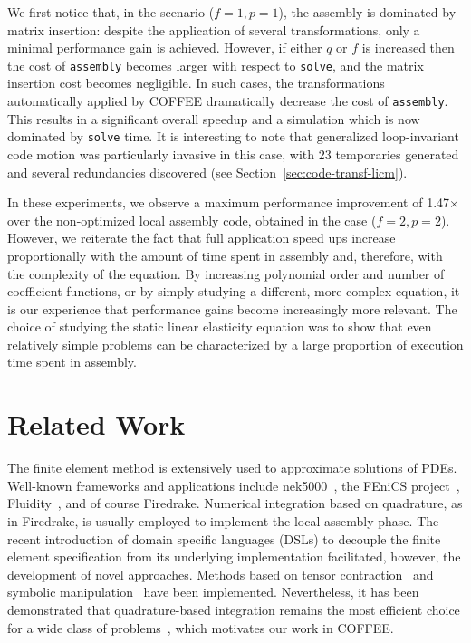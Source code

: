 We first notice that, in the scenario ($f=1, p=1$), the assembly is dominated by matrix insertion: despite the application of several transformations, only a minimal performance gain is achieved. However, if either $q$ or $f$ is increased then the cost of \texttt{assembly} becomes larger with respect to \texttt{solve}, and the matrix insertion cost becomes negligible. In such cases, the transformations automatically applied by COFFEE dramatically decrease the cost of \texttt{assembly}. This results in
a significant overall speedup and a simulation which is now dominated by \texttt{solve} time. It is interesting to note that generalized loop-invariant code motion was particularly invasive in this case, with 23 temporaries generated and several redundancies discovered (see Section~\ref{sec:code-transf-licm}).

In these experiments, we observe a maximum performance improvement of 1.47$\times$ over the non-optimized local assembly code, obtained in the case ($f=2, p=2$). However, we reiterate the fact that full application speed ups increase proportionally with the amount of time spent in assembly and, therefore, with the complexity of the equation. By
increasing polynomial order and number of coefficient functions, or by simply studying a different, more complex equation, it is our experience that performance gains become increasingly more relevant. The choice of studying the static linear elasticity equation was to show that even relatively simple problems can be characterized by a large proportion of execution time spent in assembly. 

\section{Related Work}
\label{sec:coffee-related-work}
The finite element method is extensively used to approximate solutions of PDEs. Well-known frameworks and applications include nek5000~\cite{nek5000-web-page}, the FEniCS project~\cite{Fenics}, Fluidity~\cite{fluidity_manual_v4}, and of course Firedrake. Numerical integration based on quadrature, as in Firedrake, is usually employed to implement the local assembly phase. The recent introduction of domain specific languages (DSLs) to decouple the finite element specification from its underlying implementation facilitated, however, the development of novel approaches. Methods based on tensor contraction~\citep{FFC-Compiler} and symbolic manipulation~\citep{francis} have been implemented. Nevertheless, it has been demonstrated that quadrature-based integration remains the most efficient choice for a wide class of problems~\citep{quadrature-olegaard}, which motivates our work in COFFEE.

